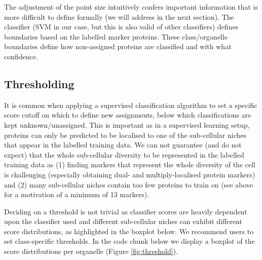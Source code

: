 The adjustment of the point size intuitively confers important
information that is more difficult to define formally (we
will address in the next section). The classifier (SVM in our case, but
this is also valid of other classifiers) defines boundaries based on
the labelled marker proteins. These class/organelle boundaries define
how non-assigned proteins are classified and with what confidence.

\subsection*{Thresholding}\label{sec:thresholding}

It is common when applying a supervised classification algorithm to
set a specific score cutoff on which to define new assignments, below
which classifications are kept unknown/unassigned. This is important
as in a supervised learning setup, proteins can only be predicted to
be localised to one of the sub-cellular niches that appear in the
labelled training data. We can not guarantee (and do not expect) that
the whole sub-cellular diversity to be represented in the labelled
training data as (1) finding markers that represent the whole
diversity of the cell is challenging (especially obtaining dual- and
multiply-localised protein markers) and (2) many sub-cellular niches
contain too few proteins to train on (see above for a motivation of a
minimum of 13 markers).

Deciding on a threshold is not trivial as classifier scores are
heavily dependent upon the classifier used and different sub-cellular
niches can exhibit different score distributions, as highlighted in
the boxplot below. We recommend users to set class-specific
thresholds.  In the code chunk below we display a boxplot of the score
distributions per organelle (Figure \ref{fig:threshold}). 

